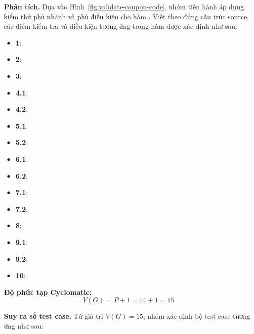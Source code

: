 \textbf{Phân tích.} Dựa vào Hình~\ref{fig:validate-coupon-code}, nhóm tiến hành áp dụng kiểm thử phủ nhánh và phủ điều kiện cho hàm . Viết theo đúng cấu trúc source, các điểm kiểm tra và điều kiện tương ứng trong hàm được xác định như sau:
\begin{itemize}
	\item \textbf{1}: 
	\item \textbf{2}: 
	\item \textbf{3}: 
	\item \textbf{4.1}: 
	\item \textbf{4.2}: 
	\item \textbf{5.1}: 
	\item \textbf{5.2}: 
	\item \textbf{6.1}: 
	\item \textbf{6.2}: 
	\item \textbf{7.1}: 
	\item \textbf{7.2}: 
	\item \textbf{8}: 
	\item \textbf{9.1}: 
	\item \textbf{9.2}: 
	\item \textbf{10}: 
\end{itemize}

\textbf{Độ phức tạp Cyclomatic:}
\[
	V(G) = P + 1 = 14 + 1 = 15
\]

\textbf{Suy ra số test case.} Từ giá trị \(V(G)=15\), nhóm xác định bộ test case tương ứng như sau:

